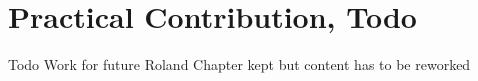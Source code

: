 \section{Practical Contribution, Todo}

Todo
Work for future Roland
Chapter kept but content has to be reworked
